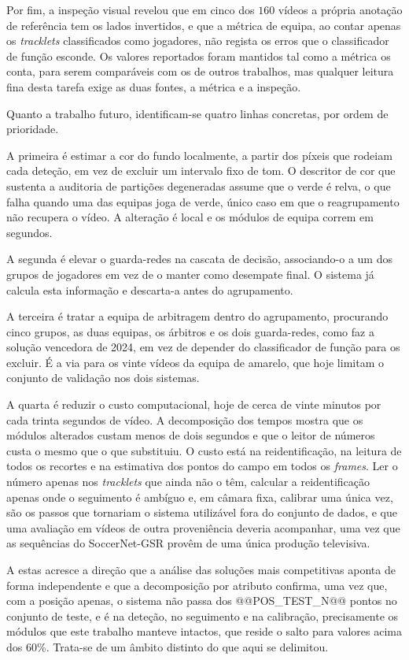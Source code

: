 Por fim, a inspeção visual revelou que em cinco dos $160$ vídeos a própria anotação de referência
tem os lados invertidos, e que a métrica de equipa, ao contar apenas os \emph{tracklets}
classificados como jogadores, não regista os erros que o classificador de função esconde. Os valores
reportados foram mantidos tal como a métrica os conta, para serem comparáveis com os de outros
trabalhos, mas qualquer leitura fina desta tarefa exige as duas fontes, a métrica e a inspeção.

Quanto a trabalho futuro, identificam-se quatro linhas concretas, por ordem de prioridade.

A primeira é estimar a cor do fundo localmente, a partir dos píxeis que rodeiam cada deteção, em vez
de excluir um intervalo fixo de tom. O descritor de cor que sustenta a auditoria de partições
degeneradas assume que o verde é relva, o que falha quando uma das equipas joga de verde, único caso
em que o reagrupamento não recupera o vídeo. A alteração é local e os módulos de equipa correm em
segundos.

A segunda é elevar o guarda-redes na cascata de decisão, associando-o a um dos grupos de jogadores
em vez de o manter como desempate final. O sistema já calcula esta informação e descarta-a antes do
agrupamento.

A terceira é tratar a equipa de arbitragem dentro do agrupamento, procurando cinco grupos, as duas
equipas, os árbitros e os dois guarda-redes, como faz a solução vencedora de 2024, em vez de
depender do classificador de função para os excluir. É a via para os vinte vídeos da equipa de
amarelo, que hoje limitam o conjunto de validação nos dois sistemas.

A quarta é reduzir o custo computacional, hoje de cerca de vinte minutos por cada trinta segundos de
vídeo. A decomposição dos tempos mostra que os módulos alterados custam menos de dois segundos e que
o leitor de números custa o mesmo que o que substituiu. O custo está na reidentificação, na leitura
de todos os recortes e na estimativa dos pontos do campo em todos os \emph{frames}. Ler o número
apenas nos \emph{tracklets} que ainda não o têm, calcular a reidentificação apenas onde o seguimento
é ambíguo e, em câmara fixa, calibrar uma única vez, são os passos que tornariam o sistema
utilizável fora do conjunto de dados, e que uma avaliação em vídeos de outra proveniência deveria
acompanhar, uma vez que as sequências do SoccerNet-GSR provêm de uma única produção televisiva.

A estas acresce a direção que a análise das soluções mais competitivas aponta de forma independente
e que a decomposição por atributo confirma, uma vez que, com a posição apenas, o sistema não passa dos
@@POS_TEST_N@@ pontos no conjunto de teste, e é na deteção, no seguimento e na calibração,
precisamente os módulos que este trabalho manteve intactos, que reside o salto para valores acima
dos $60\%$. Trata-se de um âmbito distinto do que aqui se delimitou.

